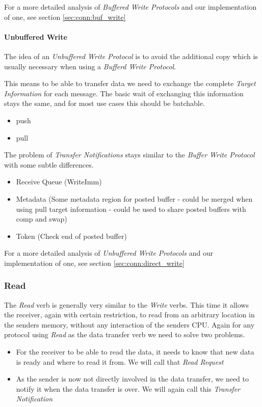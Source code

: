 For a more detailed analysis of \emph{Buffered Write Protocols} and our implementation of one, see section \ref{sec:conn:buf_write}


\paragraph{Unbuffered Write}
The idea of an \emph{Unbuffered Write Protocol} is to avoid the additional copy which is usually necessary when using a
\emph{Bufferd Write Protocol}. 

This means to be able to transfer data we need to exchange the complete \emph{Target Information} for each message. The basic
wait of exchanging this information stays the same, and for most use cases this should be batchable.

\begin{itemize}
  \item push
  \item pull
\end{itemize}

The problem of \emph{Transfer Notifications} stays similar to the \emph{Buffer Write Protocol} with some subtle differences.

\begin{itemize}
  \item Receive Queue (WriteImm)
  \item Metadata (Some metadata region for posted buffer - could be merged when using pull target information - could be used to share posted buffers with comp and swap)
  \item Token (Check end of posted buffer)
\end{itemize}


For a more detailed analysis of \emph{Unbuffered Write Protocols} and our implementation of one, see section \ref{sec:conn:direct_write}


\subsubsection{Read}
The \emph{Read} verb is generally very similar to the \emph{Write} verbs. This time it allows the receiver, again with certain
restriction, to read from an arbitrary location in the senders memory, without any interaction of the senders CPU. Again for
any protocol using \emph{Read} as the data transfer verb we need to solve two problems.

\begin{itemize}
  \item For the receiver to be able to read the data, it needs to know that new data is ready and where to read it from.
    We will call that \emph{Read Request}

  \item As the sender is now not directly involved in the data transfer, we need to notify it when the data transfer is 
over. We will again call this  \emph{Transfer Notification}
\end{itemize}


